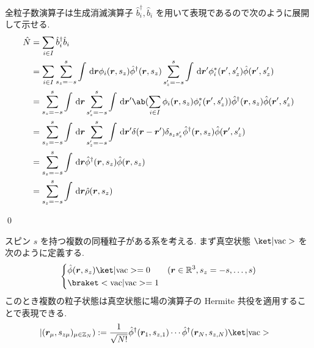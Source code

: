 \documentclass[uplatex,dvipdfmx,a4paper,11pt]{jlreq}
\makeatletter
\newcommand{\RR}{\mathbb{R}}
\newcommand{\ZZ}{\mathbb{Z}}
\newcommand{\rr}{\bm{r}}
\numberwithin{equation}{section}
\theoremstyle{definition}
\renewenvironment{proof}[1][\proofname]{\par
  \normalfont
  \topsep6\p@\@plus6\p@ \trivlist
  \item[\hskip\labelsep{\bfseries #1}\@addpunct{\bfseries}]\ignorespaces\quad\par
}{
  \qed\endtrivlist\@endpefalse
}
\renewcommand\proofname{証明}
\makeatother
\begin{document}
\begin{proof}
  全粒子数演算子は生成消滅演算子 $\hat{b}_i^\dagger, \hat{b}_i$ を用いて表現であるので次のように展開して示せる.
  \begin{align}
    \hat{N} & = \sum_{i\in I}\hat{b}_i^\dagger\hat{b}_i                                                                                                                              \\
            & = \sum_{i\in I}\sum_{s_z = -s}^s\int\dl{\rr}\phi_i(\rr, s_z)\hat{\phi}^\dagger(\rr, s_z)\sum_{s_z' = -s}^s\int\dl{\rr'}\phi_i^*(\rr', s_z')\hat{\phi}(\rr', s_z')      \\
            & = \sum_{s_z = -s}^s\int\dl{\rr}\sum_{s_z' = -s}^s\int\dl{\rr'}\ab(\sum_{i\in I}\phi_i(\rr, s_z)\phi_i^*(\rr', s_z'))\hat{\phi}^\dagger(\rr, s_z)\hat{\phi}(\rr', s_z') \\
            & = \sum_{s_z = -s}^s\int\dl{\rr}\sum_{s_z' = -s}^s\int\dl{\rr'}\delta(\rr - \rr')\delta_{s_zs_z'}\hat{\phi}^\dagger(\rr, s_z)\hat{\phi}(\rr', s_z')                     \\
            & = \sum_{s_z = -s}^s\int\dl{\rr}\hat{\phi}^\dagger(\rr, s_z)\hat{\phi}(\rr, s_z)                                                                                        \\
            & = \sum_{s_z = -s}^{s}\int\dl{\rr}\hat{\rho}(\rr, s_z)
  \end{align}
\end{proof}

\begin{definition}[複数の同種粒子の場]
  スピン $s$ を持つ複数の同種粒子がある系を考える.
  まず真空状態 $\ket|\mathrm{vac}>$ を次のように定義する.
  \begin{align}
    \begin{dcases}
      \hat{\phi}(\rr, s_z)\ket|\mathrm{vac}> = 0 & (\rr\in\RR^3, s_z = -s,\ldots,s) \\
      \braket<\mathrm{vac}|\mathrm{vac}> = 1
    \end{dcases}
  \end{align}
  このとき複数の粒子状態は真空状態に場の演算子の Hermite 共役を適用することで表現できる.
  \begin{align}
    |(\rr_\mu, s_{z\mu})_{\mu\in\ZZ_N}) & := \frac{1}{\sqrt{N!}}\hat{\phi}^\dagger(\rr_1, s_{z,1})\cdots\hat{\phi}^\dagger(\rr_N, s_{z,N})\ket|\mathrm{vac}>
  \end{align}
\end{definition}
\end{document}
